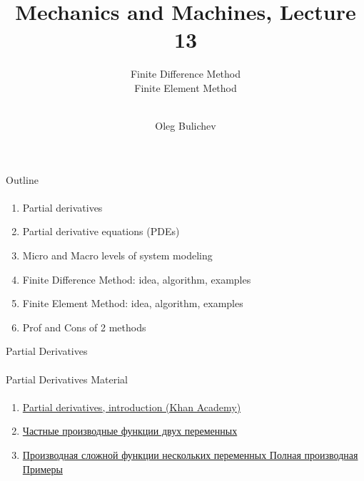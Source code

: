 \documentclass[aspectratio=169]{beamer}
\title[MaM]{Mechanics and Machines, Lecture 13} %
\subtitle{Finite Difference Method  
\\ Finite Element Method   \\   
\ } %
\author{Oleg Bulichev}
\newcommand{\fbckg}[1]{\usebackgroundtemplate{\texttt{[image: \#1]}}}%
\begin{document}
\setlength{\abovedisplayskip}{0pt}
\setlength{\belowdisplayskip}{0pt}
\setlength{\abovedisplayshortskip}{0pt}
\setlength{\belowdisplayshortskip}{0pt}

\fbckg{fibeamer/figs/title_page.png}

\fbckg{fibeamer/figs/common.png}

\note{\scriptsize \begin{itemize}
        \item \
    \end{itemize}}

\begin{frame}[t]{Outline}
    \framesubtitle{}
    \begin{enumerate}
        \item Partial derivatives
        \item Partial derivative equations (PDEs)
        \item Micro and Macro levels of system modeling
        \item Finite Difference Method: idea, algorithm, examples
        \item Finite Element Method: idea, algorithm, examples
        \item Prof and Cons of 2 methods
    \end{enumerate}
\end{frame}

\begin{frame}[t]{Partial Derivatives}
    \framesubtitle{}

\end{frame}

\begin{frame}[t]{Partial Derivatives Material}
    \framesubtitle{}
    \begin{enumerate}
        \item \href{https://www.youtube.com/watch?v=AXqhWeUEtQU}{Partial derivatives, introduction (Khan Academy) }
        \item \href{https://youtu.be/2LkVV60OS08}{Частные производные функции двух переменных}
        \item \href{https://youtu.be/YwmGyGyDB_I}{Производная сложной функции нескольких переменных Полная производная Примеры}
    \end{enumerate}
\end{frame}
\end{document}
